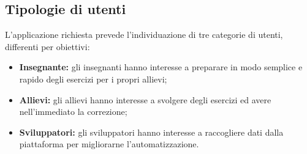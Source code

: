 \subsection{Tipologie di utenti}
L'applicazione richiesta prevede l'individuazione di tre categorie di utenti, differenti per obiettivi:
\begin{itemize}
	\item \textbf{Insegnante:} gli insegnanti hanno interesse a preparare in modo semplice e rapido degli esercizi per i propri allievi;
	\item \textbf{Allievi:} gli allievi hanno interesse a svolgere degli esercizi ed avere nell'immediato la correzione;
	\item \textbf{Sviluppatori:} gli sviluppatori hanno interesse a raccogliere dati dalla piattaforma per migliorarne l'automatizzazione.
\end{itemize}
